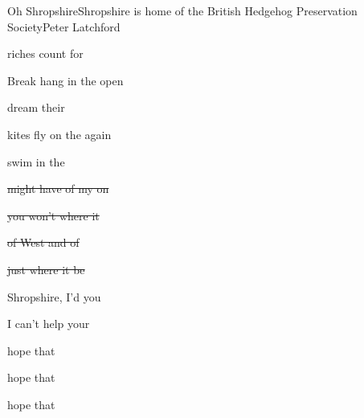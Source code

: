 \begin{SBSong}{Oh Shropshire}{Shropshire is home of the British Hedgehog Preservation Society}{Peter Latchford}
\begin{SBVerse}
     riches count for 
  \end{SBVerse}

  \begin{SBBracket}{Break}
     hang in the open 

     dream their 

     kites fly on the  again

     swim in the 
  \end{SBBracket}

  \CBPageBrk

  \begin{SBVerse}
    \sout{ might have  of my  on }

    \sout{ you won't  where it }

    \sout{ of West and  of }

    \sout{ just where it  be}
  \end{SBVerse}


  \begin{SBChorus}
     Shropshire, I'd  you 

     I can't help  your 

     hope that  

     hope that  

     hope that   
  \end{SBChorus}
\end{SBSong}